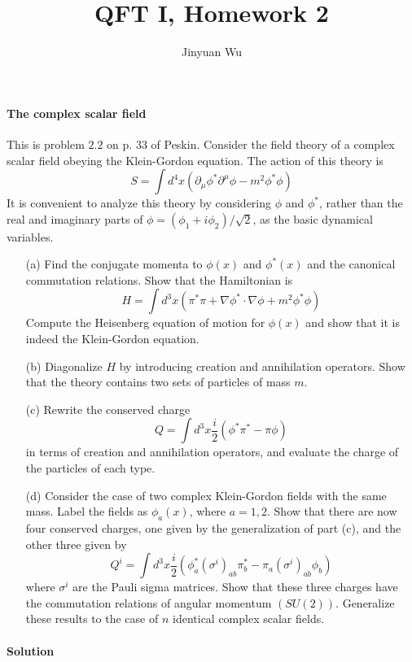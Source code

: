 \documentclass[hyperref, a4paper]{article}
\title{QFT I, Homework 2}
\author{Jinyuan Wu}
\begin{document}
\maketitle

\paragraph{The complex scalar field} This is problem $2.2$ on p. 33 of Peskin.
Consider the field theory of a complex scalar field obeying the Klein-Gordon equation. The action of this theory is
\[
S=\int d^{4} x\left(\partial_{\mu} \phi^{*} \partial^{\mu} \phi-m^{2} \phi^{*} \phi\right)
\]
It is convenient to analyze this theory by considering $\phi$ and $\phi^{*}$, rather than the real and imaginary parts of $\phi=\left(\phi_{1}+i \phi_{2}\right) / \sqrt{2}$, as the basic dynamical variables.
\begin{itemize}
  \item[(a)] Find the conjugate momenta to $\phi(x)$ and $\phi^{*}(x)$ and the canonical commutation relations. Show that the Hamiltonian is
  \[
  H=\int d^{3} x\left(\pi^{*} \pi+\nabla \phi^{*} \cdot \nabla \phi+m^{2} \phi^{*} \phi\right)
  \]
  Compute the Heisenberg equation of motion for $\phi(x)$ and show that it is indeed the Klein-Gordon equation.
  \item[(b)] Diagonalize $H$ by introducing creation and annihilation operators. Show that the theory contains two sets of particles of mass $m$.
  \item[(c)] Rewrite the conserved charge
  \[
  Q=\int d^{3} x \frac{i}{2}\left(\phi^{*} \pi^{*}-\pi \phi\right)
  \]
  in terms of creation and annihilation operators, and evaluate the charge of the particles of each type.
  \item[(d)] Consider the case of two complex Klein-Gordon fields with the same mass. Label the fields as $\phi_{a}(x)$, where $a=1,2$. Show that there are now four conserved charges, one given by the generalization of part (c), and the other three given by
  \[
  Q^{i}=\int d^{3} x \frac{i}{2}\left(\phi_{a}^{*}\left(\sigma^{i}\right)_{a b} \pi_{b}^{*}-\pi_{a}\left(\sigma^{i}\right)_{a b} \phi_{b}\right)
  \]
  where $\sigma^{i}$ are the Pauli sigma matrices. Show that these three charges have the commutation relations of angular momentum $(S U(2))$. Generalize these results to the case of $n$ identical complex scalar fields.
\end{itemize}

\paragraph{Solution}

\paragraph{}
\end{document}
